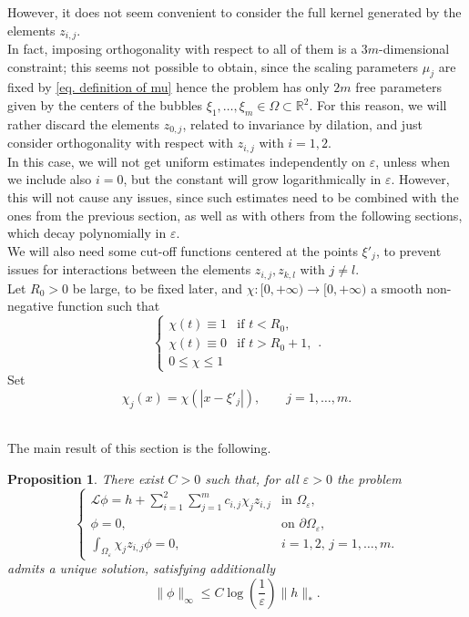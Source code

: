 \documentclass[11pt]{article}
\newtheorem{proposition}{Proposition}[section]
\begin{document}
However, it does not seem convenient to consider the full kernel generated by the elements $z_{i,j}$.\\
In fact, imposing orthogonality with respect to all of them is a $3m$-dimensional constraint; this seems not possible to obtain, since the scaling parameters $\mu_j$ are fixed by \eqref{eq. definition of mu} hence the problem has only $2m$ free parameters given by the centers of the bubbles $\xi_1,\dots,\xi_m\in\Omega\subset\mathbb R^2$. For this reason, we will rather discard the elements $z_{0,j}$, related to invariance by dilation, and just consider orthogonality with respect with $z_{i,j}$ with $i=1,2$.\\
In this case, we will not get uniform estimates independently on $\varepsilon$, unless when we include also $i=0$, but the constant will grow logarithmically in $\varepsilon$. However, this will not cause any issues, since such estimates need to be combined with the ones from the previous section, as well as with others from the following sections, which decay polynomially in $\varepsilon$.\\

We will also need some cut-off functions centered at the points $\xi'_j$, to prevent issues for interactions between the elements $z_{i,j},z_{k,l}$ with $j\ne l$.\\
Let $R_0>0$ be large, to be fixed later, and $\chi:[0,+\infty)\to[0,+\infty)$ a smooth non-negative function such that 
$$\left\{\begin{array}{ll}\chi(t)\equiv1&\mbox{if }t<R_0,\\\chi(t)\equiv0&\mbox{if }t>R_0+1,\\0\le\chi\le1\end{array}.\right.$$
Set
$$\chi_j(x)=\chi\left(\left|x-\xi'_j\right|\right),\qquad j=1,\dots,m.$$\

The main result of this section is the following.

\begin{proposition}\label{prop1}
There exist $C>0$ such that, for all $\varepsilon>0$ the problem
\begin{equation}\label{eq. unique solu}
\left\{\begin{array}{ll}
\mathcal L\phi=h+\sum_{i=1}^2\sum_{j=1}^mc_{i,j}\chi_jz_{i,j}&\text{in }\Omega_\varepsilon,\\
\phi=0,&\text{on }\partial\Omega_\varepsilon,\\
\int_{\Omega_\varepsilon}\chi_jz_{i,j}\phi=0,&i=1,2,\,j=1,\dots,m.
\end{array}\right.
\end{equation}
admits a unique solution, satisfying additionally
\begin{equation}\label{eq. prop1 7}
\|\phi\|_\infty\le C\log\left(\frac1\varepsilon\right)\|h\|_\ast.
\end{equation}
\end{proposition}\
\end{document}
